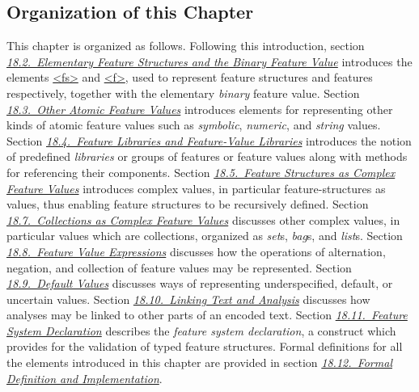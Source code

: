 \subsection[{Organization of this Chapter}]{Organization of this Chapter}\label{FSor}\par
This chapter is organized as follows. Following this introduction, section \textit{\hyperref[FSBI]{18.2.\ Elementary Feature Structures and the Binary Feature Value}} introduces the elements \hyperref[TEI.fs]{<fs>} and \hyperref[TEI.f]{<f>}, used to represent feature structures and features respectively, together with the elementary \textit{binary} feature value. Section \textit{\hyperref[FSSY]{18.3.\ Other Atomic Feature Values}} introduces elements for representing other kinds of atomic feature values such as \textit{symbolic}, \textit{numeric}, and \textit{string} values. Section \textit{\hyperref[FSFL]{18.4.\ Feature Libraries and Feature-Value Libraries}} introduces the notion of predefined \textit{libraries} or groups of features or feature values along with methods for referencing their components. Section \textit{\hyperref[FSST]{18.5.\ Feature Structures as Complex Feature Values}} introduces complex values, in particular feature-structures as values, thus enabling feature structures to be recursively defined. Section \textit{\hyperref[FSSS]{18.7.\ Collections as Complex Feature Values}} discusses other complex values, in particular values which are collections, organized as \textit{set}s, \textit{bag}s, and \textit{list}s. Section \textit{\hyperref[FVE]{18.8.\ Feature Value Expressions}} discusses how the operations of alternation, negation, and collection of feature values may be represented. Section \textit{\hyperref[FSBO]{18.9.\ Default Values}} discusses ways of representing underspecified, default, or uncertain values. Section \textit{\hyperref[FSLINK]{18.10.\ Linking Text and Analysis}} discusses how analyses may be linked to other parts of an encoded text. Section \textit{\hyperref[FD]{18.11.\ Feature System Declaration}} describes the \textit{feature system declaration}, a construct which provides for the validation of typed feature structures. Formal definitions for all the elements introduced in this chapter are provided in section \textit{\hyperref[FSDEF]{18.12.\ Formal Definition and Implementation}}. 
